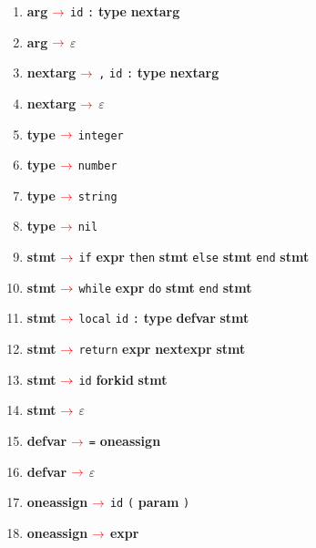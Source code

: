 \documentclass[a4paper, 11pt]{article}
\def\nonterm #1{\boldmath{$<$}\textbf{#1}\boldmath{$>$}\space}
\def\term #1{\texttt{#1}\space}
\newcommand{\arrow} {$\color{red} \rightarrow$\space}
\newcommand{\unsc} {\underline{\hspace{0.2cm}}}
\begin{document}
\begin{enumerate}[label=\textcolor{red}{\arabic*.}]
        \item \nonterm{arg} \arrow{} \term{id} \term{:} \nonterm{type} \nonterm{next\unsc{}arg}
        \item \nonterm{arg} \arrow{} \term{$\varepsilon$}

        \item \nonterm{next\unsc{}arg} \arrow{} \term{,} \term{id} \term{:} \nonterm{type} \nonterm{next\unsc{}arg}

        \item \nonterm{next\unsc{}arg} \arrow{} \term{$\varepsilon$}

        \item \nonterm{type} \arrow{} \term{integer}
        \item \nonterm{type} \arrow{} \term{number}
        \item \nonterm{type} \arrow{} \term{string}
        \item \nonterm{type} \arrow{} \term{nil}

        \item \nonterm{stmt} \arrow{} \term{if} \nonterm{expr} \term{then} \nonterm{stmt} \term{else} \nonterm{stmt} \term{end} \nonterm{stmt}

        \item \nonterm{stmt} \arrow{} \term{while} \nonterm{expr} \term{do} \nonterm{stmt} \term{end} \nonterm{stmt}

        \item \nonterm{stmt} \arrow{} \term{local} \term{id} \term{:} \nonterm{type} \nonterm{def\unsc{}var} \nonterm{stmt}

        \item \nonterm{stmt} \arrow{} \term{return} \nonterm{expr} \nonterm{next\unsc{}expr} \nonterm{stmt}

        \item \nonterm{stmt} \arrow{} \term{id} \nonterm{fork\unsc{}id} \nonterm{stmt}

        \item \nonterm{stmt} \arrow{} \term{$\varepsilon$}

        \item \nonterm{def\unsc{}var} \arrow{} \term{=} \nonterm{one\unsc{}assign}
        \item \nonterm{def\unsc{}var} \arrow{} \term{$\varepsilon$}

        \item \nonterm{one\unsc{}assign} \arrow{} \term{id} \term{(} \nonterm{param} \term{)}
        \item \nonterm{one\unsc{}assign} \arrow{} \nonterm{expr}


\end{enumerate}
\end{document}

